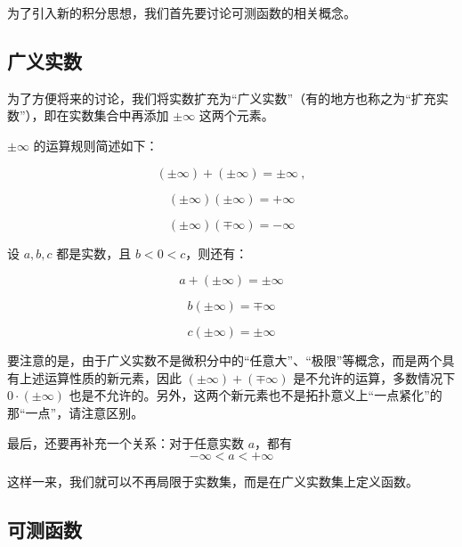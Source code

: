 
为了引入新的积分思想，我们首先要讨论可测函数的相关概念。

\subsection{广义实数}

为了方便将来的讨论，我们将实数扩充为“广义实数”（有的地方也称之为“扩充实数”），即在实数集合中再添加 $\pm\infty$ 这两个元素。

$\pm\infty$ 的运算规则简述如下：

\begin{equation}
(\pm\infty)+( \pm \infty)=\pm \infty~,
\end{equation}

\begin{equation}
(\pm\infty)(\pm\infty)=+\infty
\end{equation}

\begin{equation}
(\pm\infty)(\mp\infty)=-\infty
\end{equation}

设 $a, b, c$ 都是实数，且 $b<0<c$，则还有：

\begin{equation}
a+(\pm\infty)=\pm\infty
\end{equation}

\begin{equation}
b(\pm\infty)=\mp\infty
\end{equation}

\begin{equation}
c(\pm\infty)=\pm\infty
\end{equation}

要注意的是，由于广义实数不是微积分中的“任意大”、“极限”等概念，而是两个具有上述运算性质的新元素，因此 $(\pm\infty)+(\mp\infty)$ 是不允许的运算，多数情况下 $0\cdot(\pm\infty)$ 也是不允许的。另外，这两个新元素也不是拓扑意义上“一点紧化”的那“一点”，请注意区别。

最后，还要再补充一个关系：对于任意实数 $a$，都有
\begin{equation}
-\infty<a<+\infty
\end{equation}


这样一来，我们就可以不再局限于实数集，而是在广义实数集上定义函数。



\subsection{可测函数}

